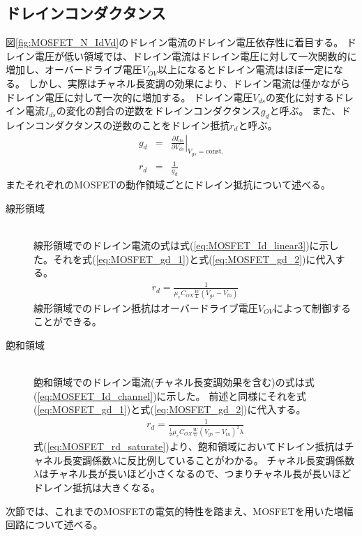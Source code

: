 	\subsection{ドレインコンダクタンス}
		図\ref{fig:MOSFET_N_IdVd}のドレイン電流のドレイン電圧依存性に着目する。
		ドレイン電圧が低い領域では、ドレイン電流はドレイン電圧に対して一次関数的に増加し、オーバードライブ電圧$V_{OV}$以上になるとドレイン電流はほぼ一定になる。
		しかし、実際はチャネル長変調の効果により、ドレイン電流は僅かながらドレイン電圧に対して一次的に増加する。
		ドレイン電圧$V_{ds}$の変化に対するドレイン電流$I_{ds}$の変化の割合の逆数をドレインコンダクタンス$g_d$と呼ぶ。
		また、ドレインコンダクタンスの逆数のことをドレイン抵抗$r_d$と呼ぶ。
		\begin{eqnarray}
			g_d & = & \left. \frac{\partial I_{ds}}{\partial V_{ds}} \right|_{V_{gs} = \mathrm{const.}} \\
			\label{eq:MOSFET_gd_1}
			r_d & = & \frac{1}{g_d}
			\label{eq:MOSFET_gd_2}
		\end{eqnarray}
		またそれぞれのMOSFETの動作領域ごとにドレイン抵抗について述べる。
		\begin{description}
			\item[線形領域]\mbox{}\\
				線形領域でのドレイン電流の式は式(\ref{eq:MOSFET_Id_linear3})に示した。それを式(\ref{eq:MOSFET_gd_1})と式(\ref{eq:MOSFET_gd_2})に代入する。
				\begin{eqnarray}
					r_d = \frac{1}{\mu_e C_{OX} \frac{W}{L} (V_{gs} - V_{th})}
					\label{eq:MOSFET_rd_linear}
				\end{eqnarray}
				線形領域でのドレイン抵抗はオーバードライブ電圧$V_{OV}$によって制御することができる。
			\item[飽和領域]\mbox{}\\
				飽和領域でのドレイン電流(チャネル長変調効果を含む)の式は式(\ref{eq:MOSFET_Id_channel})に示した。
				前述と同様にそれを式(\ref{eq:MOSFET_gd_1})と式(\ref{eq:MOSFET_gd_2})に代入する。
				\begin{eqnarray}
					r_d = \frac{1}{\frac{1}{2} \mu_e C_{OX} \frac{W}{L} {(V_{gs} - V_{th})}^2 \lambda}
					\label{eq:MOSFET_rd_saturate}
				\end{eqnarray}
				式(\ref{eq:MOSFET_rd_saturate})より、飽和領域においてドレイン抵抗はチャネル長変調係数$\lambda$に反比例していることがわかる。
				チャネル長変調係数$\lambda$はチャネル長が長いほど小さくなるので、つまりチャネル長が長いほどドレイン抵抗は大きくなる。
		\end{description}
		次節では、これまでのMOSFETの電気的特性を踏まえ、MOSFETを用いた増幅回路について述べる。
